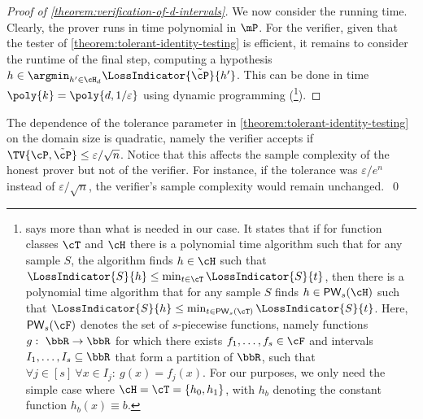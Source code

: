 \begin{proof}[Proof of \cref{theorem:verification-of-d-intervals}]
	We now consider %
the running time.  %
Clearly, the prover runs in time polynomial in $\mP$. For the verifier, given that the tester of \cref{theorem:tolerant-identity-testing} is efficient, it remains to consider the runtime of the final step, computing a hypothesis $h \in \argmin_{h' \in \cH_d} \LossIndicator{\tilde{\cP}}{h'}$. This can be done in time $\poly{k} = \poly{d, 1/\varepsilon}$ using dynamic programming %
(\cite[Theorem 4]{DBLP:journals/ml/KearnsSS94}\footnote{%
%
%
\cite[Theorem 4]{DBLP:journals/ml/KearnsSS94}  %
%
says more than what is needed in our case. It states that if for function classes $\cT$ and $\cH$ there is a polynomial time algorithm such that for any sample $S$, the algorithm finds $h \in \cH$ such that $\LossIndicator{S}{h} \leq \min_{t \in \cT}\LossIndicator{S}{t}$, then there is a polynomial time algorithm that for any sample $S$ finds $h \in \mathsf{PW}_s(\cH)$ such that $\LossIndicator{S}{h} \leq \min_{t \in \mathsf{PW}_s(\cT)}\LossIndicator{S}{t}$. Here, $\mathsf{PW}_s(\cF)$ denotes the set of $s$-piecewise functions, namely functions $g: ~ \bbR \to \bbR$ for which there exists $f_1,\dots,f_s \in \cF$ and intervals $I_1,\dots,I_s \subseteq \bbR$ that form a partition of $\bbR$, such that $\forall j \in [s] ~ \forall x \in I_j: ~ g(x) = f_j(x)$. For our purposes, we only need the simple case where $\cH = \cT = \{h_0,h_1\}$, with $h_b$ denoting the constant function $h_b(x) \equiv b$.%
	}).
\end{proof}

%

\begin{remark}
	The dependence of the tolerance parameter in \cref{theorem:tolerant-identity-testing} on the domain size is quadratic, namely the verifier accepts if $\TV{\cP,\tilde{\cP}} \leq \varepsilon/\sqrt{n}$. Notice that this affects the sample complexity of the honest prover but not of the verifier. For instance, if the tolerance was $\varepsilon/e^n$ instead of $\varepsilon/\sqrt{n}$, the verifier's sample complexity would remain unchanged.~\qed
\end{remark}

%

%

